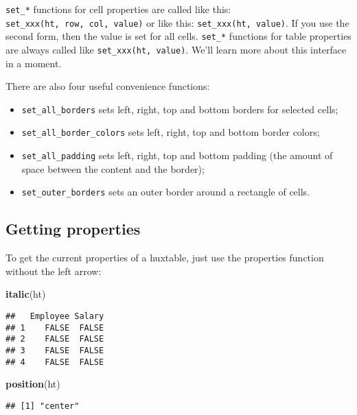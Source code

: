 \documentclass[]{article}
\newenvironment{Shaded}{\begin{snugshade}}{\end{snugshade}}
\newcommand{\KeywordTok}[1]{\textcolor[rgb]{0.13,0.29,0.53}{\textbf{#1}}}
\newcommand{\NormalTok}[1]{#1}
\providecommand{\tightlist}{%
  \setlength{\itemsep}{0pt}\setlength{\parskip}{0pt}}
\begin{document}
\texttt{set\_*} functions for cell properties are called like this:
\texttt{set\_xxx(ht,\ row,\ col,\ value)} or like this:
\texttt{set\_xxx(ht,\ value)}. If you use the second form, then the
value is set for all cells. \texttt{set\_*} functions for table
properties are always called like \texttt{set\_xxx(ht,\ value)}. We'll
learn more about this interface in a moment.

There are also four useful convenience functions:

\begin{itemize}
\tightlist
\item
  \texttt{set\_all\_borders} sets left, right, top and bottom borders
  for selected cells;
\item
  \texttt{set\_all\_border\_colors} sets left, right, top and bottom
  border colors;
\item
  \texttt{set\_all\_padding} sets left, right, top and bottom padding
  (the amount of space between the content and the border);
\item
  \texttt{set\_outer\_borders} sets an outer border around a rectangle
  of cells.
\end{itemize}

\hypertarget{getting-properties}{%
\subsection{Getting properties}\label{getting-properties}}

To get the current properties of a huxtable, just use the properties
function without the left arrow:

\begin{Shaded}
\begin{Highlighting}[]
\KeywordTok{italic}\NormalTok{(ht)}
\end{Highlighting}
\end{Shaded}

\begin{verbatim}
##   Employee Salary
## 1    FALSE  FALSE
## 2    FALSE  FALSE
## 3    FALSE  FALSE
## 4    FALSE  FALSE
\end{verbatim}

\begin{Shaded}
\begin{Highlighting}[]
\KeywordTok{position}\NormalTok{(ht)}
\end{Highlighting}
\end{Shaded}

\begin{verbatim}
## [1] "center"
\end{verbatim}
\end{document}
